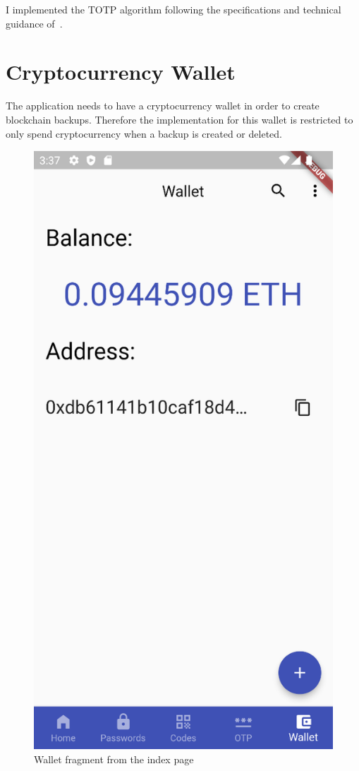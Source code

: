 \documentclass[a4paper,12pt]{report}
\begin{document}
I implemented the TOTP algorithm following the specifications and technical
guidance of~\cite{totp}.

\section{Cryptocurrency Wallet}

The application needs to have a cryptocurrency wallet in order to create
blockchain backups. Therefore the implementation for this wallet is restricted
to only spend cryptocurrency when a backup is created or deleted.

\begin{figure}[H]
    \centering
    \includegraphics[scale=0.45]{images/app/wallet.png}
    \caption{Wallet fragment from the index page}\label{fig:wallet}
\end{figure}
\end{document}
